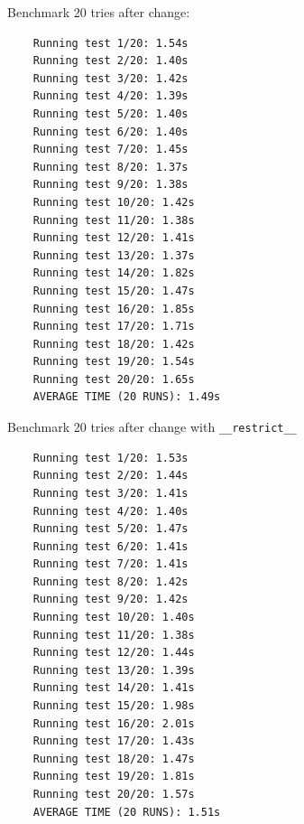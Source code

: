 Benchmark 20 tries after change:
\footnotesize\begin{verbatim}
    Running test 1/20: 1.54s
    Running test 2/20: 1.40s
    Running test 3/20: 1.42s
    Running test 4/20: 1.39s
    Running test 5/20: 1.40s
    Running test 6/20: 1.40s
    Running test 7/20: 1.45s
    Running test 8/20: 1.37s
    Running test 9/20: 1.38s
    Running test 10/20: 1.42s
    Running test 11/20: 1.38s
    Running test 12/20: 1.41s
    Running test 13/20: 1.37s
    Running test 14/20: 1.82s
    Running test 15/20: 1.47s
    Running test 16/20: 1.85s
    Running test 17/20: 1.71s
    Running test 18/20: 1.42s
    Running test 19/20: 1.54s
    Running test 20/20: 1.65s
    AVERAGE TIME (20 RUNS): 1.49s
\end{verbatim}
\normalsize

Benchmark 20 tries after change with \verb|__restrict__|
\footnotesize\begin{verbatim}
    Running test 1/20: 1.53s
    Running test 2/20: 1.44s
    Running test 3/20: 1.41s
    Running test 4/20: 1.40s
    Running test 5/20: 1.47s
    Running test 6/20: 1.41s
    Running test 7/20: 1.41s
    Running test 8/20: 1.42s
    Running test 9/20: 1.42s
    Running test 10/20: 1.40s
    Running test 11/20: 1.38s
    Running test 12/20: 1.44s
    Running test 13/20: 1.39s
    Running test 14/20: 1.41s
    Running test 15/20: 1.98s
    Running test 16/20: 2.01s
    Running test 17/20: 1.43s
    Running test 18/20: 1.47s
    Running test 19/20: 1.81s
    Running test 20/20: 1.57s
    AVERAGE TIME (20 RUNS): 1.51s
\end{verbatim}
\normalsize

